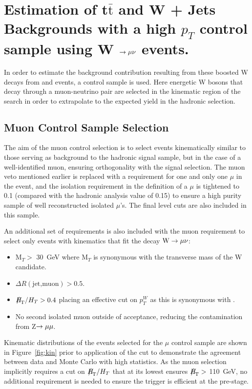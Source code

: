 \section{Estimation of t$\bar{\textrm{t}}$ and W + Jets Backgrounds with a high $p_{T}$ control sample using W $\rightarrow \mu \nu$ events.}
\label{sec:muon}
In order to estimate the background contribution resulting from these boosted W decays from \wj and \ttj events, a control sample is used. Here energetic W bosons that decay through a muon-neutrino pair are selected in the kinematic region of the search in order to extrapolate to the expected yield in the hadronic selection.
\subsection{Muon Control Sample Selection}

The aim of the muon control selection is to select events kinematically similar to those serving as background to the hadronic signal sample, but in the case of a well-identified muon, ensuring orthogonality with the signal selection. The muon veto mentioned earlier is replaced with a requirement for one and only one $\mu$ in the event, and the isolation requirement in the definition of a $\mu$ is tightened to 0.1 (compared with the hadronic analysis value of 0.15) to ensure a high purity sample of well reconstructed isolated $\mu$'s. The final level cuts are also included in this sample.

An additional set of requirements is also included with the muon requirement to select only events with kinematics that fit the decay $\textrm{W} \rightarrow \mu \nu$:
\begin{itemize}
\item M$_{T} >$ 30~GeV where M$_{T}$ is synonymous with the transverse mass of the W candidate.
\item $\Delta R(\textrm{jet,muon}) > 0.5$.
\item $\MHT / \HT > 0.4$ placing an effective cut on $p_{T}^{W}$ as this is synonymous with \MHT.
\item No second isolated muon outside of acceptance, reducing the contamination from Z$ \rightarrow \mu \mu$.
\end{itemize}

Kinematic distributions of the events selected for the $\mu$ control sample are shown in Figure~\ref{fig:kin} prior to application of the \alt cut to demonstrate the agreement between data and Monte Carlo with high statistics. As the muon selection implicitly requires a cut on $\MHT / \HT$ that at its lowest ensures $\MHT >$ 110~GeV, no additional requirement is needed to ensure the trigger is efficient at the pre-\alt stage.

